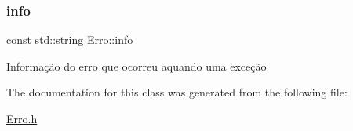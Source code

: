 \subsubsection{\texorpdfstring{info}{info}}
{\footnotesize\ttfamily const std\+::string Erro\+::info\hspace{0.3cm}{\ttfamily [private]}}

Informação do erro que ocorreu aquando uma exceção 

The documentation for this class was generated from the following file\+:\begin{DoxyCompactItemize}
\item 
\mbox{\hyperlink{_erro_8h}{Erro.\+h}}\end{DoxyCompactItemize}
